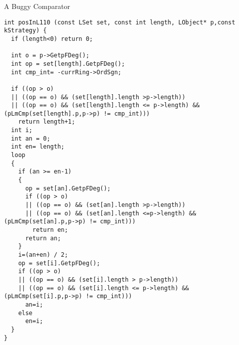 \documentclass[11pt]{beamer}
\begin{document}
\begin{frame}[fragile]{A Buggy Comparator}
\tiny\begin{verbatim}
int posInL110 (const LSet set, const int length, LObject* p,const kStrategy) {
  if (length<0) return 0;

  int o = p->GetpFDeg();
  int op = set[length].GetpFDeg();
  int cmp_int= -currRing->OrdSgn;

  if ((op > o)
  || ((op == o) && (set[length].length >p->length))
  || ((op == o) && (set[length].length <= p->length) && (pLmCmp(set[length].p,p->p) != cmp_int)))
    return length+1;
  int i;
  int an = 0;
  int en= length;
  loop
  {
    if (an >= en-1)
    {
      op = set[an].GetpFDeg();
      if ((op > o)
      || ((op == o) && (set[an].length >p->length))
      || ((op == o) && (set[an].length <=p->length) && (pLmCmp(set[an].p,p->p) != cmp_int)))
        return en;
      return an;
    }
    i=(an+en) / 2;
    op = set[i].GetpFDeg();
    if ((op > o)
    || ((op == o) && (set[i].length > p->length))
    || ((op == o) && (set[i].length <= p->length) && (pLmCmp(set[i].p,p->p) != cmp_int)))
      an=i;
    else
      en=i;
  }
}
\end{verbatim}
\end{frame}
\end{document}
